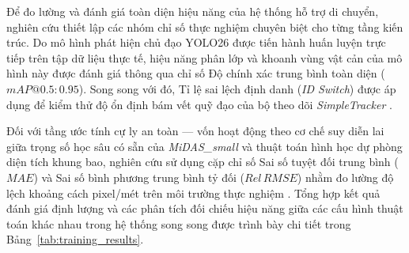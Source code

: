 Để đo lường và đánh giá toàn diện hiệu năng của hệ thống hỗ trợ di chuyển, nghiên cứu thiết lập các nhóm chỉ số thực nghiệm chuyên biệt cho từng tầng kiến trúc. Do mô hình phát hiện chủ đạo YOLO26 được tiến hành huấn luyện trực tiếp trên tập dữ liệu thực tế, hiệu năng phân lớp và khoanh vùng vật cản của mô hình này được đánh giá thông qua chỉ số Độ chính xác trung bình toàn diện ($mAP@0.5:0.95$). Song song với đó, Tỉ lệ sai lệch định danh (\textit{ID Switch}) được áp dụng để kiểm thử độ ổn định bám vết quỹ đạo của bộ theo dõi \textit{SimpleTracker} \cite{Reference12}. 

Đối với tầng ước tính cự ly an toàn — vốn hoạt động theo cơ chế suy diễn lai giữa trọng số học sâu có sẵn của \textit{MiDAS\_small} và thuật toán hình học dự phòng diện tích khung bao, nghiên cứu sử dụng cặp chỉ số Sai số tuyệt đối trung bình ($MAE$) và Sai số bình phương trung bình tỷ đối ($Rel\,RMSE$) nhằm đo lường độ lệch khoảng cách pixel/mét trên môi trường thực nghiệm \cite{Reference11}. Tổng hợp kết quả đánh giá định lượng và các phân tích đối chiếu hiệu năng giữa các cấu hình thuật toán khác nhau trong hệ thống song song được trình bày chi tiết trong Bảng~\ref{tab:training_results}.

